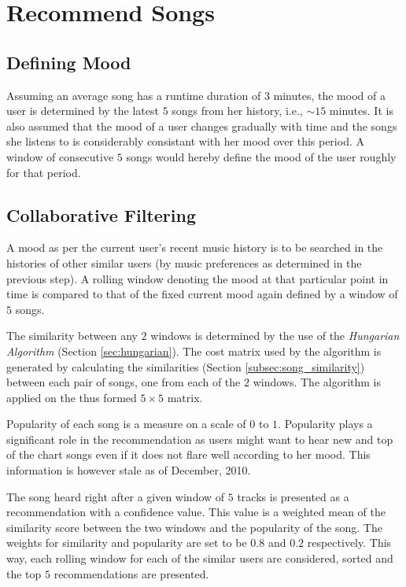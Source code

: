 	\section{Recommend Songs}
	\label{sec:recommend}
		\subsection{Defining Mood}
			Assuming an average song has a runtime duration of \(3\) minutes, the mood of a user is determined by the latest \(5\) songs from her history, i.e., $\sim$\(15\) minutes. It is also assumed that the mood of a user changes gradually with time and the songs she listens to is considerably consistant with her mood over this period. A window of consecutive \(5\) songs would hereby define the mood of the user roughly for that period.
			
		\subsection{Collaborative Filtering}
		\label{subsec:collaborative_filtering}
			A mood as per the current user's recent music history is to be searched in the histories of other similar users (by music preferences as determined in the previous step). A rolling window denoting the mood at that particular point in time is compared to that of the fixed current mood again defined by a window of \(5\) songs.
			
			The similarity between any \(2\) windows is determined by the use of the \emph{Hungarian Algorithm} (Section \ref{sec:hungarian}). The cost matrix used by the algorithm is generated by calculating the similarities (Section \ref{subsec:song_similarity}) between each pair of songs, one from each of the \(2\) windows. The algorithm is applied on the thus formed \(5 \times 5\) matrix.
			
			Popularity of each song is a measure on a scale of \(0\) to \(1\). Popularity plays a significant role in the recommendation as users might want to hear new and top of the chart songs even if it does not flare well according to her mood. This information is however stale as of December, 2010.
			
			The song heard right after a given window of \(5\) tracks is presented as a recommendation with a confidence value. This value is a weighted mean of the similarity score between the two windows and the popularity of the song. The weights for similarity and popularity are set to be \(0.8\) and \(0.2\) respectively. This way, each rolling window for each of the similar users are considered, sorted and the top \(5\) recommendations are presented.
			
